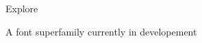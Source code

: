 \documentclass[11pt]{article}
\begin{document}
\begin{center}
	\fontsize{72}{80}\selectfont
	Explore
	
	\fontsize{16}{20}\selectfont
	\vspace{1em}A font superfamily currently in developement
\end{center}
\end{document}

